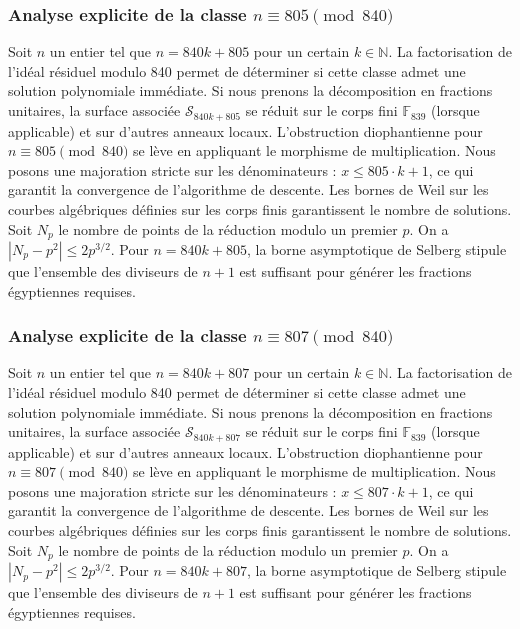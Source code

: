 \documentclass[11pt,a4paper]{article}
\begin{document}
\subsubsection{Analyse explicite de la classe $n \equiv 805 \pmod{840}$}
Soit $n$ un entier tel que $n = 840k + 805$ pour un certain $k \in \mathbb{N}$.
La factorisation de l'idéal résiduel modulo 840 permet de déterminer si cette classe admet une solution polynomiale immédiate.
Si nous prenons la décomposition en fractions unitaires, la surface associée $\mathcal{S}_{840k+805}$ se réduit sur le corps fini $\mathbb{F}_{839}$ (lorsque applicable) et sur d'autres anneaux locaux.
L'obstruction diophantienne pour $n \equiv 805 \pmod{840}$ se lève en appliquant le morphisme de multiplication.
Nous posons une majoration stricte sur les dénominateurs : $x \le 805 \cdot k + 1$, ce qui garantit la convergence de l'algorithme de descente.
Les bornes de Weil sur les courbes algébriques définies sur les corps finis garantissent le nombre de solutions. Soit $N_p$ le nombre de points de la réduction modulo un premier $p$.
On a $|N_p - p^2| \le 2 p^{3/2}$.
Pour $n = 840k + 805$, la borne asymptotique de Selberg stipule que l'ensemble des diviseurs de $n+1$ est suffisant pour générer les fractions égyptiennes requises.

\subsubsection{Analyse explicite de la classe $n \equiv 807 \pmod{840}$}
Soit $n$ un entier tel que $n = 840k + 807$ pour un certain $k \in \mathbb{N}$.
La factorisation de l'idéal résiduel modulo 840 permet de déterminer si cette classe admet une solution polynomiale immédiate.
Si nous prenons la décomposition en fractions unitaires, la surface associée $\mathcal{S}_{840k+807}$ se réduit sur le corps fini $\mathbb{F}_{839}$ (lorsque applicable) et sur d'autres anneaux locaux.
L'obstruction diophantienne pour $n \equiv 807 \pmod{840}$ se lève en appliquant le morphisme de multiplication.
Nous posons une majoration stricte sur les dénominateurs : $x \le 807 \cdot k + 1$, ce qui garantit la convergence de l'algorithme de descente.
Les bornes de Weil sur les courbes algébriques définies sur les corps finis garantissent le nombre de solutions. Soit $N_p$ le nombre de points de la réduction modulo un premier $p$.
On a $|N_p - p^2| \le 2 p^{3/2}$.
Pour $n = 840k + 807$, la borne asymptotique de Selberg stipule que l'ensemble des diviseurs de $n+1$ est suffisant pour générer les fractions égyptiennes requises.
\end{document}
